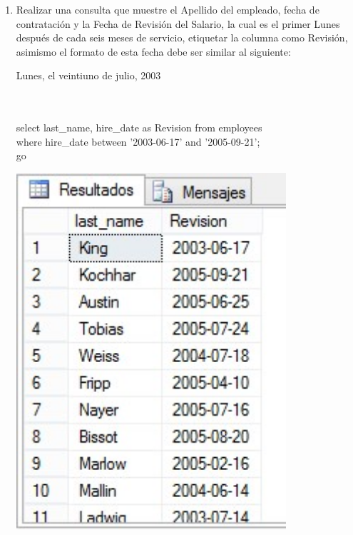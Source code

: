 \begin{enumerate}[1.]
	\item Realizar una consulta que muestre el Apellido del empleado, fecha de contratación y la Fecha de Revisión del Salario, la cual es el primer Lunes después de cada seis meses de servicio, etiquetar la columna como Revisión, asimismo el formato de esta fecha debe ser similar al siguiente: 
	\begin{center}
	Lunes, el veintiuno de julio, 2003 
	\end{center}
	\\
	\\select last\_name, hire\_date as Revision from employees 
	\\where hire\_date between '2003-06-17' and '2005-09-21';
	\\go
	\\
	\begin{center}
	\includegraphics[width=10cm]{./Imagenes/img02} 
	\end{center}


\end{enumerate}
